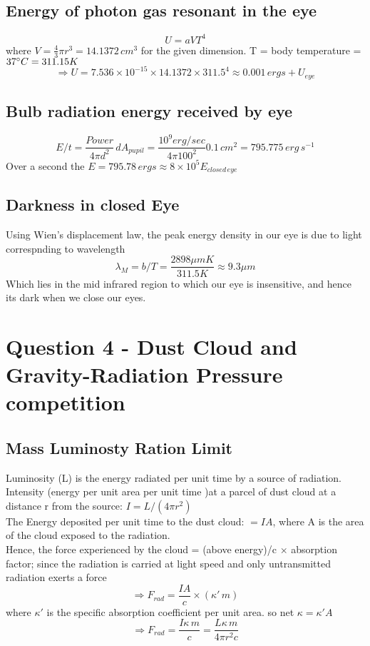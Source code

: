\documentclass[11pt]{article}
\begin{document}
		\subsection{Energy of photon gas resonant in the eye}
		\[
			U = aVT^4
		\]
		where \(V = \frac{4}{3}\pi r^3 = 14.1372 \, cm^3\) for the given dimension.
		T = body temperature = \(37 \degree C =311.15 K\)
		\[
			\Rightarrow U = 7.536 \times 10^{-15} \times 14.1372 \times 311.5^4 \boxed{\approx 0.001 \, ergs +U_{eye}}
		\]
		\subsection{Bulb radiation energy received by eye}
		\[
			\boxed{E/t = \frac{Power}{4\pi d^2} \, dA_{pupil} = \frac{10^9 erg/sec}{4\pi 100^2} 0.1 \, cm^2 = 795.775 \, erg \, s^{-1} } 
		\]
		Over a second the \(E = 795.78 \, ergs \approx 8 \times 10^5 E_{closed \, eye}\)
		
		\subsection{Darkness in closed Eye}
		
		Using Wien's displacement law, the peak energy density in our eye is due to light correspnding to wavelength 
		\[
			\boxed{\lambda_M = b/T = \frac{2898 \mu m K}{311.5 K} \approx 9.3 \mu m}
		\]
		Which lies in the mid infrared region to which our eye is insensitive, and hence its dark when we close our eyes.
		
		\section{\color{teal} Question 4 - Dust Cloud and Gravity-Radiation Pressure competition}
		
		\subsection{Mass Luminosty Ration Limit}
		
		Luminosity (L) is the energy radiated per unit time by a source of radiation.\\
		Intensity (energy per unit area per unit time )at a parcel of dust cloud  at a distance r from the source: \(I = L/(4\pi r^2)\)\\
		The Energy deposited per unit time to the dust cloud: \( = I A\), where A is the area of the cloud exposed to the radiation.\\
		Hence, the force experienced by the cloud = (above energy)/c $\times$ absorption factor; since the radiation is carried at light speed and only untransmitted radiation exerts a force
		\[
			\Rightarrow F_{rad} = \frac{IA}{c} \times (\kappa' \,m) 
		\]
		where $\kappa'$ is the specific absorption coefficient per unit area. so net $\kappa = \kappa'A$
		\[
			\Rightarrow F_{rad} = \frac{I\kappa\, m }{c}
 			= \frac{L\kappa \, m}{4 \pi r^2 c}		
 		\]
		
\end{document}
